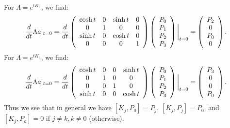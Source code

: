 \documentclass{../mathnotes}
\begin{document}
For $\Lambda=e^{tK_2}$, we find:
\begin{align*}
    \frac{d}{dt}\Lambda a|_{t=0}=\frac{d}{dt}
    \left( 
    \begin{array}[]{cccc}
        \cosh t & 0 & \sinh t & 0\\ 
        0 & 1 & 0 & 0\\ 
        \sinh t & 0 & \cosh t & 0\\ 
        0 & 0 & 0 & 1 
    \end{array}
    \right)
    \left( 
    \begin{array}[]{c}
        P_0\\
        P_1\\
        P_2\\
        P_3
    \end{array}
    \right)
    \bigg|_{t=0}=
    \left( 
    \begin{array}[]{c}
        P_2\\
        0\\
        P_0\\
        0
    \end{array}
    \right).
\end{align*}
For $\Lambda=e^{tK_3}$, we find:
\begin{align*}
    \frac{d}{dt}\Lambda a|_{t=0}=\frac{d}{dt}
    \left( 
    \begin{array}[]{cccc}
        \cosh t & 0 & 0 & \sinh t\\ 
        0 & 1 & 0 & 0\\ 
        0 & 0 & 1 & 0\\ 
        \sinh t & 0 & 0 & \cosh t 
    \end{array}
    \right)
    \left( 
    \begin{array}[]{c}
        P_0\\
        P_1\\
        P_2\\
        P_3
    \end{array}
    \right)
    \bigg|_{t=0}=
    \left( 
    \begin{array}[]{c}
        P_3\\
        0\\
        0\\
        P_0 
    \end{array}
    \right).
\end{align*}
Thus we see that in general we have $[K_j,P_0]=P_j$, $[K_j,P_j]=P_0$, and $[K_j,P_k]=0$ if $j\neq k,k\neq 0$ (otherwise).
\end{document}
